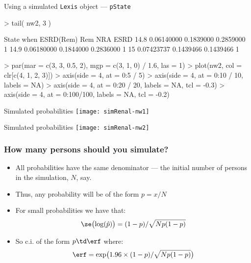 \begin{frame}{Using a simulated \texttt{Lexis} object --- \texttt{pState}}
\begin{Schunk}
\begin{Soutput}
\end{Soutput}
\begin{Sinput}
> tail( nw2, 3 )
\end{Sinput}
\begin{Soutput}
      State
when    ESRD(Rem)       Rem       NRA ESRD
  14.8 0.06140000 0.1839000 0.2859000    1
  14.9 0.06180000 0.1844000 0.2836000    1
  15   0.07423737 0.1439466 0.1439466    1
\end{Soutput}
\begin{Sinput}
> par(mar = c(3, 3, 0.5, 2), mgp = c(3, 1, 0) / 1.6, las = 1)
> plot(nw2, col = clr[c(4, 1, 2, 3)])
> axis(side = 4, at = 0:5 / 5)
> axis(side = 4, at = 0:10 / 10, labels = NA)
> axis(side = 4, at = 0:20 / 20, labels = NA, tcl = -0.3)
> axis(side = 4, at = 0:100/100, labels = NA, tcl = -0.2)
\end{Sinput}
\end{Schunk}
\end{frame}

\begin{frame}{Simulated probabilities}
\texttt{[image: simRenal-nw1]}
\end{frame}

\begin{frame}{Simulated probabilities}
\texttt{[image: simRenal-nw2]}
\end{frame}

\begin{frame}
   \frametitle{How many persons should you simulate?}
\pause
   \begin{itemize}[<+->]
   \item All probabilities have the same denominator --- the initial
     number of persons in the simulation, $N$, say.
   \item Thus, any probability will be of the form $p=x/N$
   \item For small probabilities we have that:
\[
 \se\bigl(\log(\hat p)\bigr) = (1-p)/\sqrt{N p (1-p)}
\]
\item So c.i. of the form $p\td \erf$ where:
\[
 \erf = \exp\bigl( 1.96 \times (1-p)/\sqrt{N p (1-p)} \bigr)
\]
   \end{itemize}
\end{frame}

